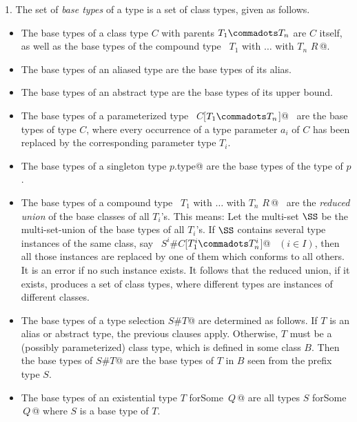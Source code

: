 1. The set of {\em base types} of a type is a set of class types, 
given as follows.
\begin{itemize}
\item
The base types of a class type $C$ with parents $T_1 \commadots T_n$ are
$C$ itself, as well as the base types of the compound type
~\lstinline@$T_1$ with $\ldots$ with $T_n$ {$R\,$}@.
\item
The base types of an aliased type are the base types of its alias.
\item
The base types of an abstract type are the base types of its upper bound.
\item
The base types of a parameterized type 
~\lstinline@$C$[$T_1 \commadots T_n$]@~ are the base types
of type $C$, where every occurrence of a type parameter $a_i$ 
of $C$ has been replaced by the corresponding parameter type $T_i$.
\item
The base types of a singleton type \lstinline@$p$.type@ are the base types of
the type of $p$.
\item
The base types of a compound type 
~\lstinline@$T_1$ with $\ldots$ with $T_n$ {$R\,$}@~ 
are the {\em reduced union} of the base
classes of all $T_i$'s. This means: 
Let the multi-set $\SS$ be the multi-set-union of the
base types of all $T_i$'s.
If $\SS$ contains several type instances of the same class, say
~\lstinline@$S^i$#$C$[$T^i_1 \commadots T^i_n$]@~ $(i \in I)$, then
all those instances 
are replaced by one of them which conforms to all
others. It is an error if no such instance exists. It follows that the reduced union, if it exists,
produces a set of class types, where different types are instances of different classes.
\item
The base types of a type selection \lstinline@$S$#$T$@ are
determined as follows. If $T$ is an alias or abstract type, the
previous clauses apply. Otherwise, $T$ must be a (possibly
parameterized) class type, which is defined in some class $B$.  Then
the base types of \lstinline@$S$#$T$@ are the base types of $T$
in $B$ seen from the prefix type $S$.
\item
The base types of an existential type \lstinline@$T$ forSome {$\,Q\,$}@ are
all types \lstinline@$S$ forSome {$\,Q\,$}@ where $S$ is a base type of $T$.
\end{itemize}

